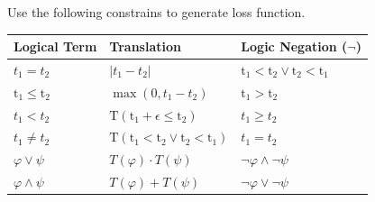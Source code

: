 \documentclass[11pt]{extarticle}
\begin{document}
\begin{multicols*}{3}
			Use the following constrains to generate loss function.
            \begin{center}
            \begin{tabular}{@{}lll@{}}
            Logical Term                                       & Translation                                                                                                                     & Logic Negation ($\neg$)                                                   \\ \midrule
            $t _ { 1 } = t _ { 2 }$                            & $\left| t _ { 1 } - t _ { 2 } \right|$                                                                                          & $\mathrm { t } _ { 1 } < \mathrm { t } _ { 2 } \vee \mathrm { t } _ { 2 } < \mathrm { t } _ { 1 }$ \\
            $\mathrm { t } _ { 1 } \leq \mathrm { t } _ { 2 }$ & $\max \left( 0 , t _ { 1 } - t _ { 2 } \right)$                                                                                 & $\mathrm { t } _ { 1 } > \mathrm { t } _ { 2 }$                                                    \\
            $t _ { 1 } < t _ { 2 }$                            & $\mathrm { T } \left( \mathrm { t } _ { 1 } + \epsilon \leq \mathrm { t } _ { 2 } \right)$                                      & $t _ { 1 } \geq t _ { 2 }$                                                                         \\
            $t _ { 1 } \neq t _ { 2 }$                         & $\mathrm { T } \left( \mathrm { t } _ { 1 } < \mathrm { t } _ { 2 } \vee \mathrm { t } _ { 2 } < \mathrm { t } _ { 1 } \right)$ & $t _ { 1 } = t _ { 2 }$                                                                            \\
            $\varphi \vee \psi$                                & $T ( \varphi ) \cdot T ( \psi )$                                                                                                & $\neg \varphi \wedge \neg \psi$                                                                    \\
            $\varphi \wedge \psi$                              & $T ( \varphi ) + T ( \psi )$                                                                                                    & $\neg \varphi \vee  \neg \psi$                                                                     \\ \bottomrule
            \end{tabular}

\end{center}
\end{multicols*}
\end{document}
